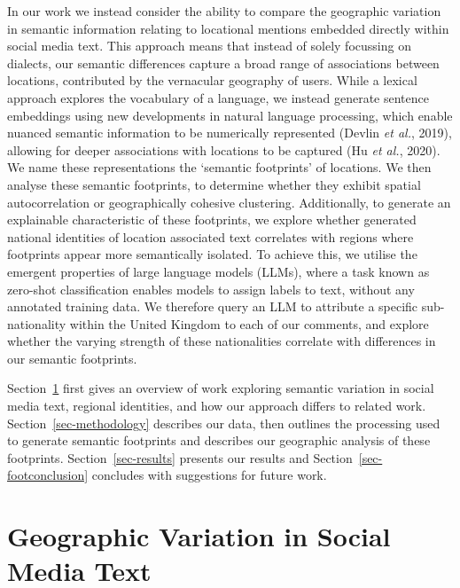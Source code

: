 \documentclass[
  letterpaper,
  11pt,
  english,
  onehalfspacing,
  headsepline]{MastersDoctoralThesis}
\begin{document}
In our work we instead consider the ability to compare the geographic
variation in semantic information relating to locational mentions
embedded directly within social media text. This approach means that
instead of solely focussing on dialects, our semantic differences
capture a broad range of associations between locations, contributed by
the vernacular geography of users. While a lexical approach explores the
vocabulary of a language, we instead generate sentence embeddings using
new developments in natural language processing, which enable nuanced
semantic information to be numerically represented (Devlin \emph{et
al.}, 2019), allowing for deeper associations with locations to be
captured (Hu \emph{et al.}, 2020). We name these representations the
`semantic footprints' of locations. We then analyse these semantic
footprints, to determine whether they exhibit spatial autocorrelation or
geographically cohesive clustering. Additionally, to generate an
explainable characteristic of these footprints, we explore whether
generated national identities of location associated text correlates
with regions where footprints appear more semantically isolated. To
achieve this, we utilise the emergent properties of large language
models (LLMs), where a task known as zero-shot classification enables
models to assign labels to text, without any annotated training data. We
therefore query an LLM to attribute a specific sub-nationality within
the United Kingdom to each of our comments, and explore whether the
varying strength of these nationalities correlate with differences in
our semantic footprints.

Section~\ref{sec-literature} first gives an overview of work exploring
semantic variation in social media text, regional identities, and how
our approach differs to related work. Section~\ref{sec-methodology}
describes our data, then outlines the processing used to generate
semantic footprints and describes our geographic analysis of these
footprints. Section~\ref{sec-results} presents our results and
Section~\ref{sec-footconclusion} concludes with suggestions for future
work.

\hypertarget{sec-literature}{%
\section{Geographic Variation in Social Media
Text}\label{sec-literature}}
\end{document}
